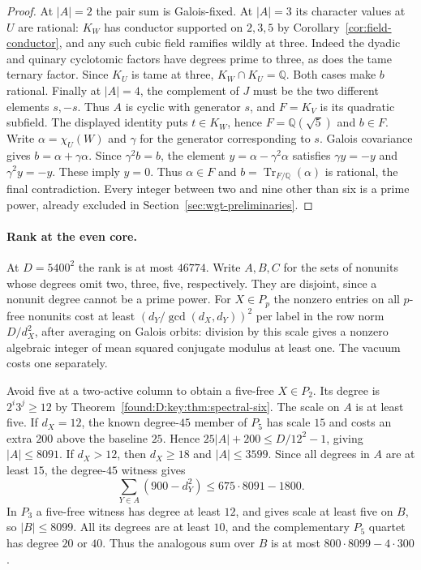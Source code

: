 \documentclass[11pt,a4paper]{article}
\numberwithin{equation}{section}
\theoremstyle{remark}
\newcommand{\QQ}{\mathbb Q}
\begin{document}
\begin{proof}
At $|A|=2$ the pair sum is Galois-fixed. At $|A|=3$ its character
values at $U$ are rational: $K_W$ has conductor supported on $2,3,5$
by Corollary~\ref{cor:field-conductor}, and any such cubic field ramifies wildly at three.
Indeed the dyadic and quinary cyclotomic factors have degrees prime to
three, as does the tame ternary factor. Since $K_U$ is tame at three,
$K_W\cap K_U=\QQ$. Both cases make $b$ rational. Finally at $|A|=4$,
the complement of $J$ must be the two different elements $s,-s$.
Thus $A$ is cyclic with generator $s$, and $F=K_V$ is its quadratic
subfield. The displayed identity puts $t\in K_W$, hence $F=\QQ(\sqrt5)$
and $b\in F$. Write $\alpha=\chi_U(W)$ and $\gamma$ for the generator
corresponding to $s$. Galois covariance gives $b=\alpha+\gamma\alpha$.
Since $\gamma^2b=b$, the element $y=\alpha-\gamma^2\alpha$ satisfies
$\gamma y=-y$ and $\gamma^2 y=-y$. These imply $y=0$. Thus $\alpha\in F$
and $b=\operatorname{Tr}_{F/\QQ}(\alpha)$ is rational, the final
contradiction. Every integer between two and nine other than six is a prime power, already excluded in Section~\ref{sec:wgt-preliminaries}.
\end{proof}

\paragraph{Rank at the even core.}\label{por:rank-upper}
At $D=5400^2$ the rank is at most $46774$. Write $A,B,C$ for the sets of nonunits whose degrees omit
two, three, five, respectively. They are disjoint, since a nonunit degree
cannot be a prime power. For $X\in P_p$ the nonzero entries on all $p$-free
nonunits cost at least $(d_Y/\gcd(d_X,d_Y))^2$ per label in the row norm
$D/d_X^2$, after averaging on Galois orbits: division by this scale gives
a nonzero algebraic integer of mean squared conjugate modulus at least one.
The vacuum costs one separately.

Avoid five at a two-active column to obtain a five-free $X\in P_2$.
Its degree is $2^i3^j\ge12$ by Theorem~\ref{found:D:key:thm:spectral-six}.
The scale on $A$ is at least five. If $d_X=12$, the known degree-$45$
member of $P_5$ has scale $15$ and costs an extra $200$ above the baseline
$25$. Hence $25|A|+200\le D/12^2-1$, giving $|A|\le8091$.
If $d_X>12$, then $d_X\ge18$ and $|A|\le3599$.
Since all degrees in $A$ are at least $15$, the degree-$45$ witness gives
\[
 \sum_{Y\in A}(900-d_Y^2)\le675\cdot8091-1800.
\]
In $P_3$ a five-free witness has degree at least $12$, and gives scale at
least five on $B$, so $|B|\le8099$. All its degrees are at least $10$,
and the complementary $P_5$ quartet has degree $20$ or $40$.
Thus the analogous sum over $B$ is at most $800\cdot8099-4\cdot300$.
\end{document}
